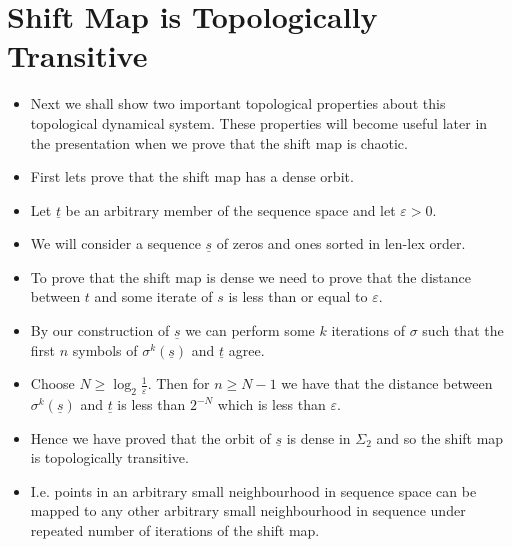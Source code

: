 \documentclass{article}
\begin{document}
    \section{Shift Map is Topologically Transitive}
    \begin{itemize}
        \item Next we shall show two important topological properties about this topological dynamical system. These properties will become useful later in the presentation when we prove that the shift map is chaotic.
        \item First lets prove that the shift map has a dense orbit.
        \item Let $\underline{t}$ be an arbitrary member of the sequence space and let $\varepsilon > 0$.
        \item We will consider a sequence $\underline{s}$ of zeros and ones sorted in len-lex order.
        \item To prove that the shift map is dense we need to prove that the distance between $t$ and some iterate of $s$ is less than or equal to $\varepsilon$.
        \item By our construction of $\underline{s}$ we can perform some $k$ iterations of $\sigma$ such that the first $n$ symbols of $\sigma^k(\underline{s})$ and $\underline{t}$ agree.
        \item Choose $N \geq \log_2{\frac{1}{\varepsilon}}$. Then for $n \geq N - 1$ we have that the distance between $\sigma^k(\underline{s})$ and $\underline{t}$ is less than $2^{-N}$ which is less than $\varepsilon$.
        \item Hence we have proved that the orbit of $\underline{s}$ is dense in $\Sigma_2$ and so the shift map is topologically transitive.
        \item I.e. points in an arbitrary small neighbourhood in sequence space can be mapped to any other arbitrary small neighbourhood in sequence under repeated number of iterations of the shift map.
    \end{itemize}
\end{document}
